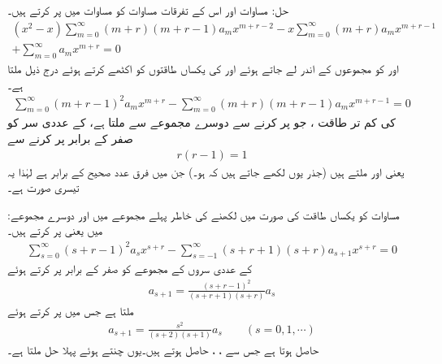 حل: مساوات  اور اس کے تفرقات مساوات  کو مساوات  میں پر کرتے ہیں۔
\begin{multline*}
(x^2-x)\sum_{m=0}^{\infty} (m+r)(m+r-1)a_mx^{m+r-2}-x\sum_{m=0}^{\infty}(m+r)a_m x^{m+r-1}\\
+\sum_{m=0}^{\infty} a_mx^{m+r}=0
\end{multline*}
  اور  کو مجموعوں کے اندر لے جاتے ہوئے اور  کی یکساں طاقتوں کو اکٹھے کرتے ہوئے درج ذیل ملتا ہے۔
\begin{align}\label{مساوات_بیسل_تیسری_صورت_الف}
\sum_{m=0}^{\infty} (m+r-1)^2a_mx^{m+r}-\sum_{m=0}^{\infty} (m+r)(m+r-1)a_mx^{m+r-1}=0
\end{align}
 کی کم تر طاقت ، جو   پر کرنے سے دوسرے مجموعے سے ملتا ہے، کے عددی سر کو صفر کے برابر پر کرنے سے
\begin{align*}
r(r-1)=1
\end{align*}
یعنی  اور  ملتے ہیں (جذر یوں لکھے جاتے ہیں کہ  ہو۔) جن میں فرق عدد صحیح کے برابر  ہے لہٰذا یہ تیسری صورت ہے۔

:مساوات  کو یکساں طاقت کی صورت میں لکھنے کی خاطر پہلے مجموعے میں  اور دوسرے مجموعے میں  یعنی  پر کرتے ہیں۔
 \begin{align}
\sum_{s=0}^{\infty} (s+r-1)^2a_sx^{s+r}-\sum_{s=-1}^{\infty} (s+r+1)(s+r)a_{s+1}x^{s+r}=0
\end{align}
 کے عددی سروں کے مجموعے کو صفر کے برابر پر کرتے ہوئے
\begin{align*}
a_{s+1}=\frac{(s+r-1)^2}{(s+r+1)(s+r)}a_s
\end{align*}
ملتا ہے جس میں  پر کرتے ہوئے 
\begin{align}
a_{s+1}=\frac{s^2}{(s+2)(s+1)}a_s\quad \quad (s=0,1,\cdots)
\end{align}
حاصل ہوتا ہے  جس سے ، ،  حاصل ہوتے ہیں۔یوں  چنتے ہوئے پہلا حل  ملتا ہے۔

